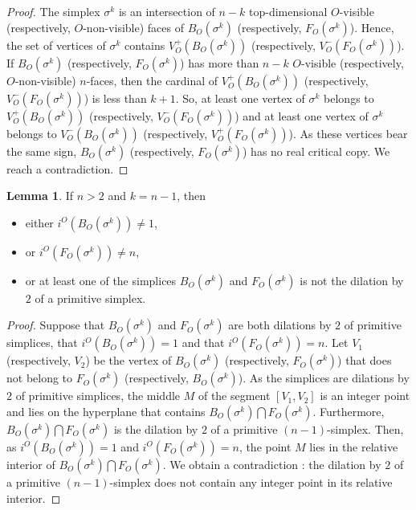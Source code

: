 \documentclass[12pt]{article}
\theoremstyle{definition}
\newtheorem{lem}{Lemma}[section]
\begin{document}
\begin{proof}
    The simplex $\sigma^k$ is an intersection of $n-k$  top-dimensional $O$-visible (respectively, $O$-non-visible) faces of $B_O(\sigma^k)$ (respectively, $F_O(\sigma^k)$). Hence, the set of vertices of $\sigma^k$ contains $V_O^+(B_O(\sigma^k))$ (respectively, $V_O^-(F_O(\sigma^k))$). If $B_O(\sigma^k)$ (respectively, $F_O(\sigma^k)$) has more than 
    $n-k$
    $O$-visible (respectively, $O$-non-visible) $n$-faces, then the cardinal of $V_O^+(B_O(\sigma^k))$ (respectively, $V_O^-(F_O(\sigma^k))$) is less than $k+1$. So, at least one vertex of $\sigma^k$ belongs to $V_O^+(B_O(\sigma^k))$ (respectively, $V_O^-(F_O(\sigma^k))$) and at least one vertex of $\sigma^k$ belongs to $V_O^-(B_O(\sigma^k))$ (respectively, $V_O^+(F_O(\sigma^k))$). As these vertices bear the same sign, $B_O(\sigma^k)$ (respectively, $F_O(\sigma^k)$) has no real critical copy. We reach a contradiction. 
\end{proof}

\begin{lem}
    \label{lemme_technique_n-1_simplexes}
    If $n>2$ and $k = n-1$, then
    \begin{itemize}
        \item either $i^O(B_O(\sigma^k)) \neq 1$,
        \item or $i^O(F_O(\sigma^k)) \neq n$,
        \item or at least one of the simplices $B_O(\sigma^k)$ and $F_O(\sigma^k)$ is not the dilation by $2$ of a primitive simplex.
    \end{itemize}
\end{lem}

\begin{proof}
    Suppose that $B_O(\sigma^k)$ and $F_O(\sigma^k)$ are both dilations by $2$ of primitive simplices, that $i^O(B_O(\sigma^k)) = 1$ and that $i^O(F_O(\sigma^k)) = n$. Let $V_1$ (respectively, $V_2$) be the vertex of $B_O(\sigma^k)$ (respectively, $F_O(\sigma^k)$) that does not belong to $F_O(\sigma^k)$ (respectively, $B_O(\sigma^k)$). As the simplices are dilations by $2$ of primitive simplices, the middle $M$ of the segment $[V_1, V_2]$ is an integer point and lies on the hyperplane that contains $B_O(\sigma^k) \bigcap F_O(\sigma^k)$. Furthermore, $B_O(\sigma^k) \bigcap F_O(\sigma^k)$ is the dilation by $2$ of a primitive $(n-1)$-simplex. Then, as $i^O(B_O(\sigma^k)) = 1$ and $i^O(F_O(\sigma^k)) = n$, the point $M$ lies in the relative interior of $B_O(\sigma^k) \bigcap F_O(\sigma^k)$. We obtain a contradiction : the dilation by $2$ of a primitive $(n-1)$-simplex does not contain any integer point in its relative interior. 
\end{proof}
\end{document}
